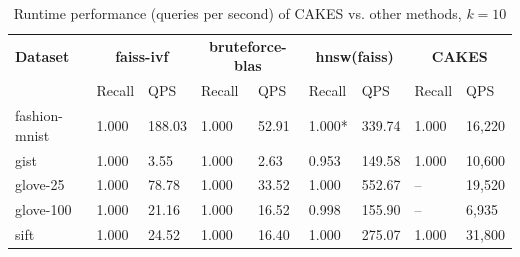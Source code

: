 \begin{table}[!t]
    \caption{Runtime performance (queries per second) of CAKES vs. other methods, $k=10$}
    \label{table:results:ann-10}
    \vskip 0.15in
    \begin{center}
    \begin{small}
    \begin{sc}
    \begin{tabular}{|l|p{1cm}|p{1cm}|p{1cm}|p{1cm}|p{1cm}|p{1cm}|p{1cm}|p{1cm}|}
    \textbf{Dataset}  & \multicolumn{2}{|c|}{\textbf{faiss-ivf}} & \multicolumn{2}{|c|}{\textbf{bruteforce-blas}} & \multicolumn{2}{|c|}{\textbf{hnsw(faiss)}} & \multicolumn{2}{|c|}{\textbf{CAKES}} \\
    \cline{2-9}
    &                    Recall & QPS                           & Recall & QPS                           & Recall & QPS                                           & Recall & QPS \\
    \hline
    fashion-mnist      & 1.000 & 188.03                           & 1.000 & 52.91                                  & 1.000* & 339.74                                                    & 1.000 & 16,220 \\
    \hline
    gist                   & 1.000 & 3.55                           & 1.000 & 2.63                                     & 0.953 & 149.58                                                   & 1.000 & 10,600 \\
    \hline
    glove-25              & 1.000 & 78.78                          & 1.000 & 33.52                              & 1.000 & 552.67                                                  & -- & 19,520 \\
    \hline
    glove-100             & 1.000 & 21.16                          & 1.000 & 16.52                                & 0.998 & 155.90                                                  & -- & 6,935 \\
    \hline
    sift                  & 1.000 &  24.52                          & 1.000 & 16.40                               & 1.000 & 275.07                                                    & 1.000 & 31,800 \\
    \hline
    \end{tabular}
    \end{sc}
    \end{small}
    \end{center}
    \vskip -0.1in
    \end{table}


